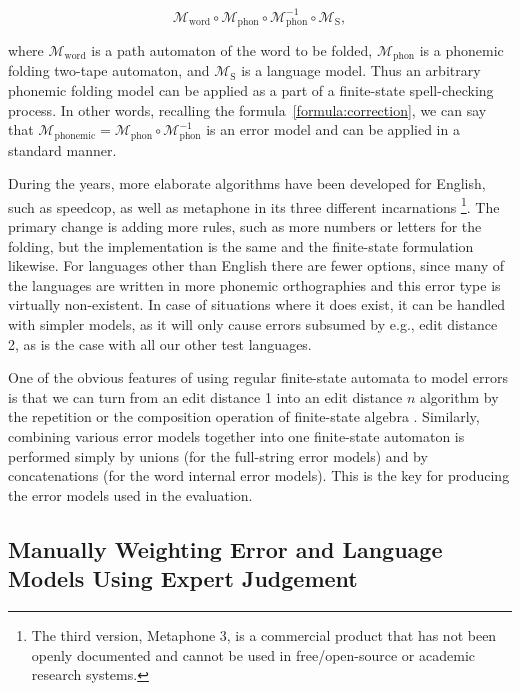 \documentclass[a4paper,12pt]{article}
\begin{document}
\begin{equation}
    \mathcal{M}_{\mathrm{word}} \circ \mathcal{M}_{\mathrm{phon}} \circ \mathcal{M}_{\mathrm{phon}}^{-1} \circ \mathcal{M}_{\mathrm{S}},
\end{equation}

where $\mathcal{M}_{\mathrm{word}}$ is a path automaton of the word to be
folded, $\mathcal{M}_{\mathrm{phon}}$ is a phonemic folding two-tape automaton,
and $\mathcal{M}_{\mathrm{S}}$ is a language model. Thus an arbitrary phonemic
folding model can be applied as a part of a finite-state spell-checking
process. In other words, recalling the formula~\ref{formula:correction}, we
can say that $\mathcal{M}_{\mathrm{phonemic}} = \mathcal{M}_{\mathrm{phon}}
\circ \mathcal{M}_{\mathrm{phon}}^{-1}$ is an error model and can be applied in
a standard manner.


During the years, more elaborate algorithms have been developed for English,
such as speedcop, as well as metaphone in its three different incarnations
\cite[]{philips1990hanging,philips2000double}\footnote{The third version,
Metaphone 3, is a commercial product that has not been openly documented and
cannot be used in free/open-source or academic research systems.}.  The primary
change is adding more rules, such as more numbers or letters for the folding,
but the implementation is the same and the finite-state formulation likewise.
For languages other than English there are fewer options, since many of the
languages are written in more phonemic orthographies and this error type is
virtually non-existent.  In case of situations where it does exist, it can be handled with simpler
models, as it will only cause errors subsumed by e.g., edit distance 2, as is the
case with all our other test languages.

One of the obvious features of using regular finite-state automata to model
errors is that we can turn from an edit distance 1 into an edit distance $n$
algorithm by the repetition or the composition operation of finite-state
algebra \cite[]{pirinen2012effects}. Similarly, combining various error models
together into one finite-state automaton is performed simply by unions (for the
full-string error models) and by concatenations (for the word internal error
models). This is the key for producing the error models used in the evaluation.

\subsection{Manually Weighting Error and Language Models Using Expert
Judgement}
\label{subsec:manual-weighting}
\end{document}
